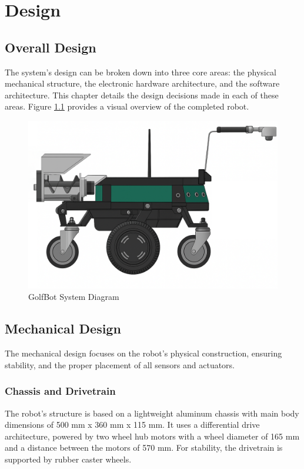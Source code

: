 \chapter{Design}
\label{chap:design}

\section{Overall Design}
\label{sec:overall_design}
The system's design can be broken down into three core areas: the physical mechanical structure, the electronic hardware architecture, and the software architecture. This chapter details the design decisions made in each of these areas. Figure \ref{fig:golfbot_system_diagram} provides a visual overview of the completed robot.

\begin{figure}[h!]
    \centering
    \includegraphics[width=0.7\linewidth]{figures/complete.png}
    \caption{GolfBot System Diagram}
    \label{fig:golfbot_system_diagram}
\end{figure}

\section{Mechanical Design}
\label{sec:mechanical_design}
The mechanical design focuses on the robot's physical construction, ensuring stability, and the proper placement of all sensors and actuators.

\subsection{Chassis and Drivetrain}
\label{ssec:chassis_drivetrain}
The robot's structure is based on a lightweight aluminum chassis with main body dimensions of 500 mm x 360 mm x 115 mm. It uses a differential drive architecture, powered by two wheel hub motors with a wheel diameter of 165 mm and a distance between the motors of 570 mm. For stability, the drivetrain is supported by rubber caster wheels.


